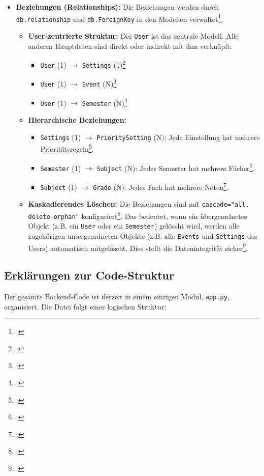 \documentclass[12pt,a4paper]{report}
\begin{document}
\begin{itemize}
    \item \textbf{Beziehungen (Relationships):}
    Die Beziehungen werden durch \texttt{db.relationship} und \texttt{db.ForeignKey} in den Modellen verwaltet\footcite{app.py}.
    \begin{itemize}
        \item \textbf{User-zentrierte Struktur:} Der \texttt{User} ist das zentrale Modell. Alle anderen Hauptdaten sind direkt oder indirekt mit ihm verknüpft:
        \begin{itemize}
            \item \texttt{User} (1) $\to$ \texttt{Settings} (1)\footcite{app.py}
            \item \texttt{User} (1) $\to$ \texttt{Event} (N)\footcite{app.py}
            \item \texttt{User} (1) $\to$ \texttt{Semester} (N)\footcite{app.py}
        \end{itemize}
        \item \textbf{Hierarchische Beziehungen:}
        \begin{itemize}
            \item \texttt{Settings} (1) $\to$ \texttt{PrioritySetting} (N): Jede Einstellung hat mehrere Prioritätsregeln\footcite{app.py}.
            \item \texttt{Semester} (1) $\to$ \texttt{Subject} (N): Jedes Semester hat mehrere Fächer\footcite{app.py}.
            \item \texttt{Subject} (1) $\to$ \texttt{Grade} (N): Jedes Fach hat mehrere Noten\footcite{app.py}.
        \end{itemize}
        \item \textbf{Kaskadierendes Löschen:} Die Beziehungen sind mit \texttt{cascade="all, delete-orphan"} konfiguriert\footcite{app.py}. Das bedeutet, wenn ein übergeordnetes Objekt (z.B. ein \texttt{User} oder ein \texttt{Semester}) gelöscht wird, werden alle zugehörigen untergeordneten Objekte (z.B. alle \texttt{Events} und \texttt{Settings} des Users) automatisch mitgelöscht. Dies stellt die Datenintegrität sicher\footcite{main.tex}.
    \end{itemize}
\end{itemize}

\subsection{Erklärungen zur Code-Struktur}
Der gesamte Backend-Code ist derzeit in einem einzigen Modul, \texttt{app.py}, organisiert. Die Datei folgt einer logischen Struktur:
\end{document}
